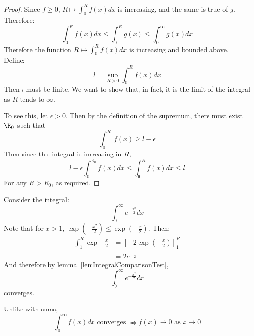 \documentclass[../Main.tex]{subfiles}
\begin{document}
\begin{proof}
    Since $f \geq 0$, $R \mapsto \int_0^R f(x) dx$ is increasing, and the same is true of $g$. Therefore:
    \begin{equation*}
        \int_0^R f(x) dx \leq \int_0^R g(x) \leq \int_0^\infty g(x) dx
    \end{equation*}
    Therefore the function $R \mapsto \int_0^R f(x) dx$ is increasing and bounded above. Define:
    \begin{equation*}
        l = \sup_{R > 0} \int_0^R f(x) dx
    \end{equation*}
    Then $l$ must be finite. We want to show that, in fact, it is the limit of the integral as $R$ tends to $\infty$.

    To see this, let $\epsilon > 0$. Then by the definition of the supremum, there must exist $\R_0$ such that:
    \begin{equation*}
        \int_0^{R_0} f(x) \geq l - \epsilon
    \end{equation*}
    Then since this integral is increasing in $R$, 
    \begin{equation*}
        l - \epsilon \int_0^{R_0} f(x) dx \leq \int_0^R f(x) dx \leq l
    \end{equation*}
    For any $R > R_0$, as required.
\end{proof}
\begin{example}
    Consider the integral:
    \begin{equation*}
        \int_0^{\infty} e^{-\frac{x^2}{2}} dx
    \end{equation*}
    Note that for $x > 1$, $\exp\left(-\frac{x^2}{2}\right) \leq \exp\left(-\frac{x}{2}\right)$.
    Then:
    \begin{align*}
        \int_1^R \exp{-\frac{x}{2}} &= \left[-2 \exp\left(-\frac{x}{2}\right)\right]_1^R \\
        &= 2e^{-\frac{1}{2}}
    \end{align*}
    And therefore by lemma~\ref{lemIntegralComparisonTest},
    \begin{equation*}
        \int_0^{\infty} e^{-\frac{x^2}{2}} dx
    \end{equation*}
    converges.
\end{example}
\begin{warning}
    Unlike with sums,
    \begin{equation*}
        \int_0^\infty f(x) dx \text{ converges } \nRightarrow f(x) \to 0 \text{ as } x \to 0
    \end{equation*}
\end{warning}
\end{document}
